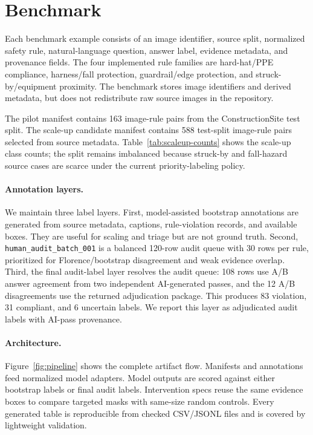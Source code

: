 \section{Benchmark}

Each benchmark example consists of an image identifier, source split, normalized safety rule, natural-language question, answer label, evidence metadata, and provenance fields. The four implemented rule families are hard-hat/PPE compliance, harness/fall protection, guardrail/edge protection, and struck-by/equipment proximity. The benchmark stores image identifiers and derived metadata, but does not redistribute raw source images in the repository.

The pilot manifest contains 163 image-rule pairs from the ConstructionSite test split. The scale-up candidate manifest contains 588 test-split image-rule pairs selected from source metadata. Table~\ref{tab:scaleup-counts} shows the scale-up class counts; the split remains imbalanced because struck-by and fall-hazard source cases are scarce under the current priority-labeling policy.

\paragraph{Annotation layers.}
We maintain three label layers. First, model-assisted bootstrap annotations are generated from source metadata, captions, rule-violation records, and available boxes. They are useful for scaling and triage but are not ground truth. Second, \texttt{human\_audit\_batch\_001} is a balanced 120-row audit queue with 30 rows per rule, prioritized for Florence/bootstrap disagreement and weak evidence overlap. Third, the final audit-label layer resolves the audit queue: 108 rows use A/B answer agreement from two independent AI-generated passes, and the 12 A/B disagreements use the returned adjudication package. This produces 83 violation, 31 compliant, and 6 uncertain labels. We report this layer as adjudicated audit labels with AI-pass provenance.

\begin{table}[h]
\centering
\caption{Scale-up candidate manifest class counts.}
\label{tab:scaleup-counts}

\end{table}

\paragraph{Architecture.}
Figure~\ref{fig:pipeline} shows the complete artifact flow. Manifests and annotations feed normalized model adapters. Model outputs are scored against either bootstrap labels or final audit labels. Intervention specs reuse the same evidence boxes to compare targeted masks with same-size random controls. Every generated table is reproducible from checked CSV/JSONL files and is covered by lightweight validation.
